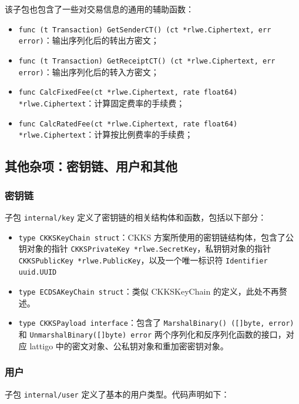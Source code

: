 该子包也包含了一些对交易信息的通用的辅助函数：

\begin{itemize}
    \item \verb|func (t Transaction) GetSenderCT() (ct *rlwe.Ciphertext, err error)|：输出序列化后的转出方密文；
    \item \verb|func (t Transaction) GetReceiptCT() (ct *rlwe.Ciphertext, err error)|：输出序列化后的转入方密文；
    \item \verb|func CalcFixedFee(ct *rlwe.Ciphertext, rate float64) *rlwe.Ciphertext|：计算固定费率的手续费；
    \item \verb|func CalcRatedFee(ct *rlwe.Ciphertext, rate float64) *rlwe.Ciphertext|：计算按比例费率的手续费；
\end{itemize}

\subsection{其他杂项：密钥链、用户和其他}

\subsubsection*{密钥链}

子包 \verb|internal/key| 定义了密钥链的相关结构体和函数，包括以下部分：

\begin{itemize}
    \item \verb|type CKKSKeyChain struct|：CKKS 方案所使用的密钥链结构体，包含了公钥对象的指针 \verb|CKKSPrivateKey *rlwe.SecretKey|，私钥钥对象的指针\\
    \verb|CKKSPublicKey *rlwe.PublicKey|，以及一个唯一标识符 \verb|Identifier uuid.UUID|
    \item \verb|type ECDSAKeyChain struct|：类似 CKKSKeyChain 的定义，此处不再赘述。
    \item \verb|type CKKSPayload interface|：包含了 \verb|MarshalBinary() ([]byte, error)| 和 \verb|UnmarshalBinary([]byte) error| 两个序列化和反序列化函数的接口，对应 lattigo 中的密文对象、公私钥对象和重加密密钥对象。
\end{itemize}

\subsubsection{用户}

子包 \verb|internal/user| 定义了基本的用户类型。代码声明如下：

